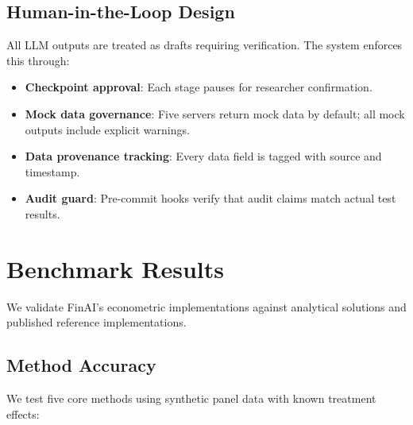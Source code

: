 \documentclass[12pt, a4paper]{article}
\begin{document}
\subsection{Human-in-the-Loop Design}

All LLM outputs are treated as drafts requiring verification. The system enforces this through:

\begin{itemize}
    \item \textbf{Checkpoint approval}: Each stage pauses for researcher confirmation.
    \item \textbf{Mock data governance}: Five servers return mock data by default; all mock outputs include explicit warnings.
    \item \textbf{Data provenance tracking}: Every data field is tagged with source and timestamp.
    \item \textbf{Audit guard}: Pre-commit hooks verify that audit claims match actual test results.
\end{itemize}

\section{Benchmark Results}

We validate FinAI's econometric implementations against analytical solutions and published reference implementations.

\subsection{Method Accuracy}

We test five core methods using synthetic panel data with known treatment effects:
\end{document}
